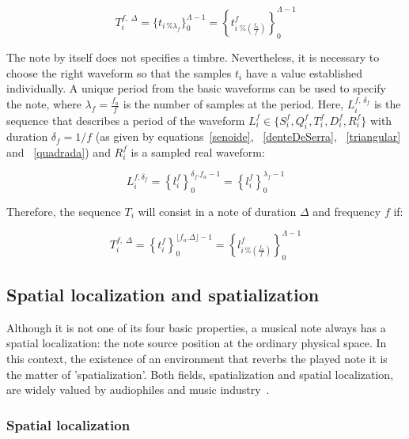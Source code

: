 \documentclass[
 aip,
 jmp,
 amsmath,amssymb,
 reprint,
]{revtex4-1}
\begin{document}
\begin{equation}\label{eq:notaBasica}
T_i^{f,\; \Delta}=\{t_{i \, \% \lambda_f} \}_0^{\Lambda-1}= \left \{t^f_{i \; \% \left( \frac{f_a}{f} \right) } \right \}_0^{\Lambda-1}
\end{equation}

The note by itself does not specifies a timbre. Nevertheless, it is necessary to choose the right waveform so that the samples $t_i$ have a value established individually. A unique period from the basic waveforms can be used to specify the note, where $\lambda_f=\frac{f_a}{f}$ is the number of samples at the period. Here, $L_i^{f,\, \delta_f} $ is the sequence that describes a period of the waveform $L_i^f \in \{S_i^f,Q_i^f,T_i^f,D_i^f,R_i^f \}$ with duration $\delta_f=1/f$ (as given by equations~\ref{senoide}, ~\ref{denteDeSerra}, ~\ref{triangular} and ~\ref{quadrada}) and $R_i^f$ is a sampled real waveform:

\begin{equation}\label{periodoUnico}
L_i^{f , \delta_f } = \left\{ l_i^f \right\}_0^{\delta_f . f_a -1}=\left\{ l_i^f \right\}_0^{\lambda_f-1}
\end{equation}

Therefore, the sequence $T_i$ will consist in a note of duration $\Delta$ and frequency $f$ if:

\begin{equation}\label{eq:notaBasicaTimbre}
T_i^{f,\; \Delta}=\left\{t_i^f\right\}_0^{\lfloor f_a . \Delta \rfloor -1}=\left \{ l^f_{i\,\%\left(\frac{f_a}{f}\right)} \right \}_0^{\Lambda-1}
\end{equation}

\subsection{Spatial localization and spatialization}\label{subsec:spac}

Although it is not one of its four basic properties, a musical note always has a spatial localization: the note source position at the ordinary physical space. In this context, the existence of an environment that reverbs the played note it is the matter of 'spatialization'. Both fields, spatialization and spatial localization, are widely valued by audiophiles and music industry~\cite{floEsp}. 

\subsubsection{Spatial localization}
\end{document}
